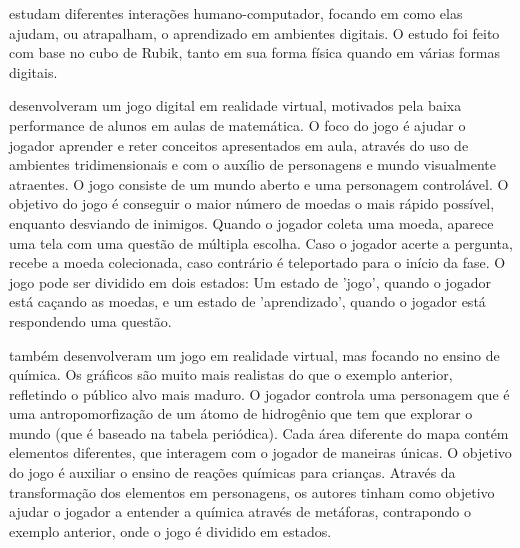 \cite{Tabuti:2010:analise} estudam diferentes interações humano-computador, 
focando em como elas ajudam, ou atrapalham, o aprendizado em ambientes 
digitais. O estudo foi feito com base no cubo de Rubik, tanto em sua 
forma física quando em várias formas digitais.

\cite{SBGames:2015:RVAM} desenvolveram um jogo digital em realidade 
virtual, motivados pela baixa performance de alunos em aulas de matemática. 
O foco do jogo é ajudar o jogador aprender e reter conceitos apresentados 
em aula, através do uso de ambientes tridimensionais e com o auxílio de 
personagens e mundo visualmente atraentes. O jogo consiste de um mundo 
aberto e uma personagem controlável. O objetivo do jogo é conseguir o 
maior número de moedas o mais rápido possível, enquanto desviando de 
inimigos. Quando o jogador coleta uma moeda, aparece uma tela com uma questão 
de múltipla escolha. Caso o jogador acerte a pergunta, recebe a moeda 
colecionada, caso contrário é teleportado para o início da fase. O jogo pode 
ser dividido em dois estados: Um estado de 'jogo', quando o jogador está 
caçando as moedas, e um estado de 'aprendizado', quando o jogador está 
respondendo uma questão.

\cite{Alves:2015:VR_Quimica} também desenvolveram um jogo em realidade 
virtual, mas focando no ensino de química. Os gráficos são muito mais 
realistas do que o exemplo anterior, refletindo o público alvo mais 
maduro. O jogador controla uma personagem que é uma antropomorfização 
de um átomo de hidrogênio que tem que explorar o mundo (que é baseado 
na tabela periódica). Cada área diferente do mapa contém elementos 
diferentes, que interagem com o jogador de maneiras únicas. O objetivo 
do jogo é auxiliar o ensino de reações químicas para crianças. Através 
da transformação dos elementos em personagens, os autores tinham como 
objetivo ajudar o jogador a entender a química através de metáforas, 
contrapondo o exemplo anterior, onde o jogo é dividido em estados.

